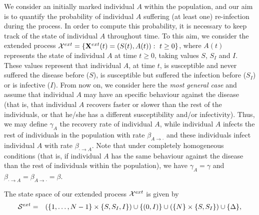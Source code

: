 \documentclass[10pt,A4paper]{article}
\begin{document}
\par We consider an initially marked individual $A$ within the population, and our aim is to quantify the probability of individual $A$ suffering
(at least one) re-infection during the process. In order to compute this probability, it is necessary to keep track of the state of individual $A$
throughout time. To this aim, we consider the extended process ${\cal X}^{ext}=\{{\bf X}^{ext}(t)=(S(t),A(t)):\ t\geq0\}$, where $A(t)$ represents the state of individual
$A$ at time $t\geq0$, taking values $S$, $S_I$ and $I$. These values represent that individual $A$, at time $t$, is susceptible and never suffered the
disease before ($S$), is susceptible but suffered the infection before ($S_I$) or is infective ($I$). From now on, we consider here the {\it most
general case} and assume that individual $A$ may have an specific behaviour against the disease (that is, that individual $A$ recovers faster or slower than
the rest of the individuals, or that he/she has a different susceptibility and/or infectivity). Thus, we may define
$\gamma_A$ the recovery rate of individual $A$, while individual $A$ infects the rest of individuals in the population with rate $\beta_{A\rightarrow\cdot}$ and these individuals infect
individual $A$ with rate $\beta_{\cdot\rightarrow A}$. Note that under completely homogeneous conditions (that is, if individual $A$ has the same behaviour against the disease than the rest of
individuals within the population), we have $\gamma_A=\gamma$ and $\beta_{\cdot\rightarrow A}=\beta_{A\rightarrow\cdot}=\beta$.

\par The state space of our extended process ${\cal X}^{ext}$ is given by
\begin{eqnarray*}
 {\cal S}^{ext} &=& \left(\{1,\dots,N-1\}\times\{S,S_I,I\}\right)\cup\{(0,I)\}\cup\left(\{N\}\times\{S,S_I\}\right)\cup\{\Delta\},
\end{eqnarray*}
\end{document}
